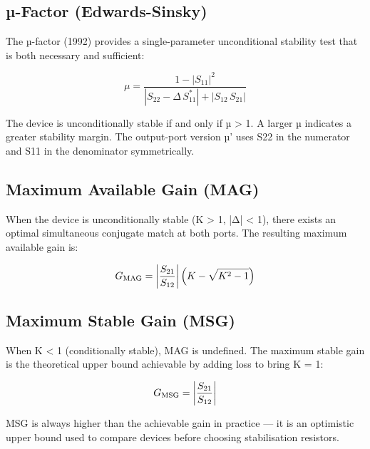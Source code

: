 \subsection{µ-Factor (Edwards-Sinsky)}

				

The µ-factor (1992) provides a single-parameter unconditional stability test that is both necessary and sufficient:

				
\[\mu = \dfrac{1 - |S_{11}|^2}{|S_{22} - \Delta\,S_{11}^*| + |S_{12}\,S_{21}|}\]

				

The device is unconditionally stable if and only if µ \textgreater{} 1. A larger µ indicates a greater stability margin. The output-port version µ' uses S22 in the numerator and S11 in the denominator symmetrically.

				


				

\subsection{Maximum Available Gain (MAG)}

				

When the device is unconditionally stable (K \textgreater{} 1, |Δ| \textless{} 1), there exists an optimal simultaneous conjugate match at both ports. The resulting maximum available gain is:

				
\[G_{\rm MAG} = \left|\dfrac{S_{21}}{S_{12}}\right|\left(K - \sqrt{K^2-1}\right)\]

				

\subsection{Maximum Stable Gain (MSG)}

				

When K \textless{} 1 (conditionally stable), MAG is undefined. The maximum stable gain is the theoretical upper bound achievable by adding loss to bring K = 1:

				
\[G_{\rm MSG} = \left|\dfrac{S_{21}}{S_{12}}\right|\]

				

MSG is always higher than the achievable gain in practice — it is an optimistic upper bound used to compare devices before choosing stabilisation resistors.

